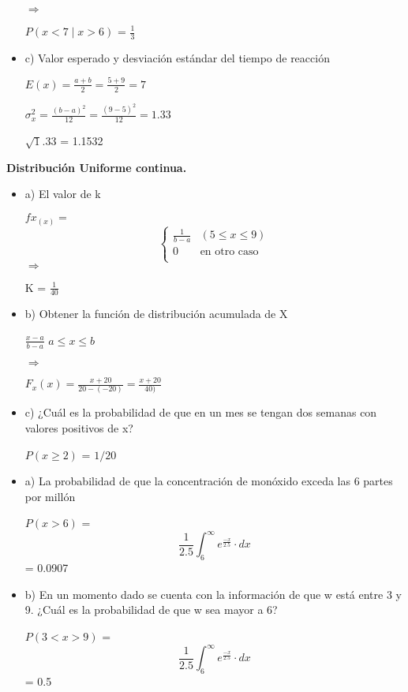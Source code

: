 \documentclass{../oxmathproblems}
\begin{document}
\begin{questions}
\begin{itemize}
$\Rightarrow$

$ P(x < 7 \mid x > 6) $ = $\frac{1}{3}$


\item  c) Valor esperado y desviación estándar del tiempo de reacción

$E(x) = \frac{a+b}{2} = \frac{5+9}{2} = 7$


$\sigma_x^2 = \frac{(b-a)^2}{12} = \frac{(9-5)^2}{12} = 1.33$


$\sqrt1.33$ = 1.1532 
\end{itemize}


\miquestion \textbf {Distribución Uniforme continua.} 

\begin{itemize}
\item  a) El valor de k 

 
$ fx_(x) = $
$$$$
\[   
     \begin{cases}
\frac{1}{b-a} & (5 \leq x \leq 9)\\
       0 & \text{en otro caso} \\
     \end{cases}
\]
$$$$
$\Rightarrow$
 
 K = $\frac{1}{40}$

\item  b) Obtener la función de distribución acumulada de X

$\frac{x-a}{b-a}$    $ a \leq x \leq b$

$\Rightarrow$

$ F_x(x) = \frac{x+20}{20-(-20)}  = \frac{x+20}{40)} $

\item  c) ¿Cuál es la probabilidad de que en un mes se tengan dos semanas con valores positivos de x?

$ P(x \geq 2)$ = $ 1/20 $
\end{itemize}

\miquestion
\begin{itemize}
\item a) La probabilidad de que la concentración de monóxido exceda las 6 partes por millón

$P(x>6)$
= 
\begin{equation}
 \frac{1}{2.5} \int_6^\infty {e^{\frac{-x}{2.5}}} \cdot dx
\end{equation}  
= 0.0907



\item b) En un momento dado se cuenta con la información de que w está entre 3 y 9. ¿Cuál es la probabilidad de que w sea mayor a 6?

$P(3<x>9)$
= 
\begin{equation}
 \frac{1}{2.5} \int_6^\infty {e^{\frac{-x}{2.5}}} \cdot dx
\end{equation}  
= 0.5
\end{itemize}


\end {questions}
\end{document}
